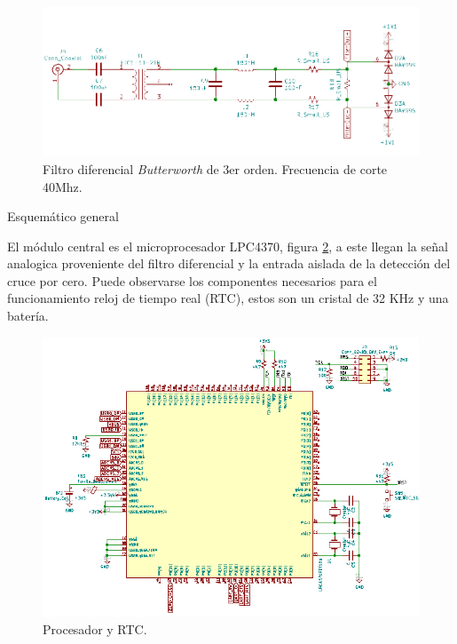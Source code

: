 \begin{figure}[ht]
	\centering
	\includegraphics[width=140mm]{./Figures/schFiltro.png}
	\caption{Filtro diferencial \textit{Butterworth} de 3er orden. Frecuencia de corte 40Mhz.}
	\label{fig:schFiltro}
\end{figure}

\vspace{15mm}

Esquemático general 

El módulo central es el microprocesador LPC4370, figura \ref{fig:schCentral}, a este llegan la señal analogica proveniente del filtro diferencial y la entrada aislada de la detección del cruce por cero. Puede observarse los componentes necesarios para el funcionamiento reloj de tiempo real (RTC), estos son un cristal de 32 KHz y una batería.

\vspace{10mm}

\begin{figure}[ht]
	\centering
	\includegraphics[width=140mm]{./Figures/schCentral.png}
	\caption{Procesador y RTC.}
	\label{fig:schCentral}
\end{figure}

